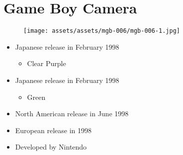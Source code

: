 \documentclass{book}
\begin{document}
\begingroup \chapter*{Game Boy Camera} \endgroup
\begin{figure}[H]
\vskip 4pt
\centering
\texttt{[image: assets/assets/mgb-006/mgb-006-1.jpg]}\end{figure}
\begin{itemize} [nosep]




\item Japanese release in February 1998
\begin{itemize} [nosep]\item Clear Purple\end{itemize}\noindent






\item Japanese release in February 1998
\begin{itemize} [nosep]\item Green\end{itemize}\noindent






\item North American release in June 1998







\item European release in 1998












\item Developed by Nintendo

\end{itemize}\noindent
\end{document}
